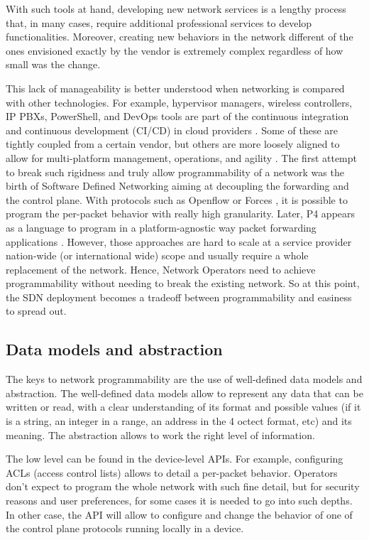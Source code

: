 \documentclass[a4paper,fleqn]{cas-dc}
\begin{document}
With such tools at hand, developing new network services is a lengthy process that, in many cases, require additional professional services to develop functionalities. Moreover, creating new behaviors in the network different of the ones envisioned exactly by the vendor is extremely complex regardless of how small was the change.

This lack of manageability is better understood when networking is compared with other technologies. For example, hypervisor managers, wireless controllers, IP PBXs, PowerShell, and DevOps tools are part of the continuous integration and continuous development (CI/CD) in cloud providers \cite{mittal2017cloud,demchenko2016zerotouch}. Some of these are tightly coupled from a certain vendor, but others are more loosely aligned to allow for multi-platform management, operations, and agility \cite{edelman2018network}.
The first attempt to break such rigidness and truly allow programmability of a network was the birth of Software Defined Networking aiming at decoupling the forwarding and the control plane. With protocols such as Openflow \cite{mckeown2008openflow} or Forces \cite{doria2010forwarding}, it is possible to program the per-packet behavior with really high granularity. Later, P4 appears as a language to program in a platform-agnostic way packet forwarding applications \cite{bosshart2014p4}. However, those approaches are hard to scale at a service provider nation-wide (or international wide) scope and usually require a whole replacement of the network. Hence, Network Operators need to achieve programmability without needing to break the existing network. So at this point, the SDN deployment becomes a tradeoff between programmability and easiness to spread out. 

\subsection{Data models and abstraction}

The keys to network programmability are the use of well-defined data models and abstraction. The well-defined data models allow to represent any data that can be written or read, with a clear understanding of its format and possible values (if it is a string, an integer in a range, an address in the 4 octect format, etc) and its meaning.  The abstraction allows to work the right level of information. 

The low level can be found in the device-level APIs. For example, configuring ACLs (access control lists) allows to detail a per-packet behavior. Operators don’t expect to program the whole network with such fine detail, but for security reasons and user preferences, for some cases it is needed to go into such depths. In other case, the API will allow to configure and change the behavior of one of the control plane protocols running locally in a device.
\end{document}
